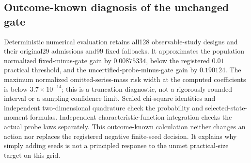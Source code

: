 \subsection{Outcome-known diagnosis of the unchanged gate}
Deterministic numerical evaluation retains all128 observable-study designs and their original29 admissions and99 fixed fallbacks.
It approximates the population normalized fixed-minus-gate gain by $0.00875334$, below the registered $0.01$ practical threshold, and the uncertified-probe-minus-gate gain by $0.190124$.
The maximum normalized omitted-series-mass risk width at the computed coefficients is below $3.7\times10^{-14}$; this is a truncation diagnostic, not a rigorously rounded interval or a sampling confidence limit.
Scaled chi-square identities and independent two-dimensional quadrature check the probability and selected-state-moment formulas.
Independent characteristic-function integration checks the actual probe laws separately.
This outcome-known calculation neither changes an action nor replaces the registered negative finite-seed decision.
It explains why simply adding seeds is not a principled response to the unmet practical-size target on this grid.
